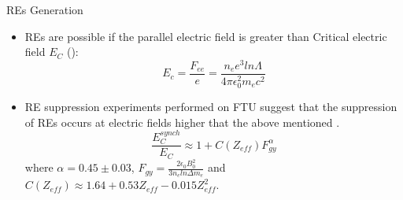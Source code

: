 \documentclass{beamer}
\begin{document}
\begin{frame}[allowframebreaks]{REs Generation}
\begin{itemize}
	\item REs are possible if the  parallel electric field is greater than
	Critical electric field $E_C$ (\cite{connor1975relativistic}):
	\begin{equation}
	\label{eq:criticalElectricField}
	E_c = \frac{F_{ee}}{e} = \frac{n_e e^3 ln \Lambda}{4 \pi \epsilon^2_0 m_e c^2}
	\end{equation}
	\item RE suppression experiments performed on FTU suggest that the suppression of REs occurs at electric fields higher that the above mentioned \cite{Esposito2016}.
	\begin{equation}
	\frac{E_C^{synch}}{E_C} \approx 1+C(Z_{eff}) F_{gy}^{\alpha}
	\end{equation}
	where $\alpha = 0.45 \pm 0.03$, $F_{gy} = \frac{2 \epsilon_0 B_0^2}{3 n_e ln \Delta m_e} $ and $C(Z_{eff}) \approx 1.64 + 0.53 Z_{eff} - 0.015 Z_{eff}^2 $.
\end{itemize}

\end{frame}
\end{document}
